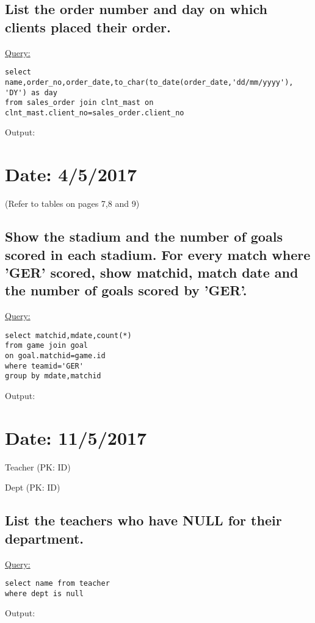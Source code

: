 \documentclass[a4paper,11pt]{article}
\begin{document}
\subsection{List the order number and day on which clients placed their order.}
\underline{Query:}
\begin{lstlisting}[showstringspaces=false]
select name,order_no,order_date,to_char(to_date(order_date,'dd/mm/yyyy'), 'DY') as day
from sales_order join clnt_mast on clnt_mast.client_no=sales_order.client_no
\end{lstlisting}
Output:
\begin{figure}[H]
\centering
{}
\end{figure}
\bigskip

\section{Date: 4/5/2017}

(Refer to tables on pages 7,8 and 9)

\subsection{Show the stadium and the number of goals scored in each stadium. For every match where 'GER' scored, show matchid, match date and the number of goals scored by 'GER'.}
\underline{Query:}
\begin{lstlisting}[showstringspaces=false]
select matchid,mdate,count(*)
from game join goal 
on goal.matchid=game.id
where teamid='GER'
group by mdate,matchid
\end{lstlisting}
Output:
\begin{figure}[H]
\centering
{}
\end{figure}
\bigskip

\section{Date: 11/5/2017}
\large{}
\LARGE{Teacher (PK: ID)}

\bigskip

\bigskip

\large{}
\LARGE{Dept (PK: ID)}

\bigskip

\bigskip

\subsection{List the teachers who have NULL for their department.}
\underline{Query:}
\begin{lstlisting}[showstringspaces=false]
select name from teacher
where dept is null
\end{lstlisting}
Output:
\begin{figure}[H]
\centering
{}
\end{figure}
\bigskip
\end{document}
